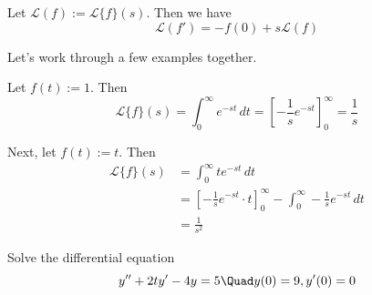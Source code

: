 Let $\mathcal L(f):=\mathcal L\{f\}(s)$. Then we have
$$
	\mathcal L(f')=-f(0)+s\mathcal L(f)
$$

\begin{compute}
	Let's work through a few examples together.

	Let $f(t):=1$. Then
	$$
		\mathcal L\{f\}(s)
		=\int_0^\infty e^{-st}\,dt
		=\left[-\frac1se^{-st}\right]_0^\infty
		=\frac1s
	$$

	Next, let $f(t):=t$. Then
	\begin{align}
		\mathcal L\{f\}(s)
		 & =\int_0^\infty te^{-st}\,dt                                                    \\
		 & =\left[-\frac1se^{-st}\cdot t\right]_0^\infty-\int_0^\infty-\frac1se^{-st}\,dt \\
		 & =\frac1{s^2}
	\end{align}
\end{compute}

\newpage
{}\label{b0e53e0}

Solve the differential equation
$$
	y'' + 2ty' - 4y = 5\Quad y(0)=9,y'(0)=0
$$

